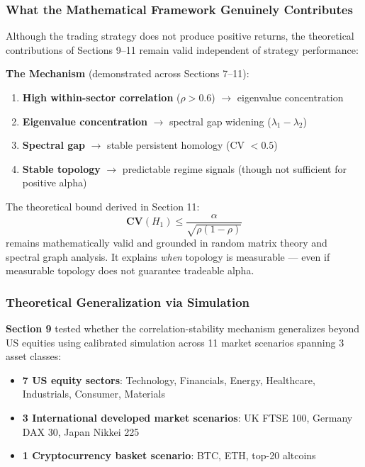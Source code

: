 \subsubsection{What the Mathematical Framework Genuinely Contributes}

Although the trading strategy does not produce positive returns, the theoretical contributions of Sections 9--11 remain valid independent of strategy performance:

\textbf{The Mechanism} (demonstrated across Sections 7--11):
\begin{enumerate}
\item \textbf{High within-sector correlation} ($\rho > 0.6$) $\rightarrow$ eigenvalue concentration
\item \textbf{Eigenvalue concentration} $\rightarrow$ spectral gap widening ($\lambda_1 - \lambda_2$)
\item \textbf{Spectral gap} $\rightarrow$ stable persistent homology (CV $< 0.5$)
\item \textbf{Stable topology} $\rightarrow$ predictable regime signals (though not sufficient for positive alpha)
\end{enumerate}

The theoretical bound derived in Section 11:
\begin{equation}
\textbf{CV}(H_1) \leq \frac{\alpha}{\sqrt{\rho(1-\rho)}}
\end{equation}
remains mathematically valid and grounded in random matrix theory and spectral graph analysis. It explains \textit{when} topology is measurable --- even if measurable topology does not guarantee tradeable alpha.

\subsubsection{Theoretical Generalization via Simulation}

\textbf{Section 9} tested whether the correlation-stability mechanism generalizes beyond US equities using calibrated simulation across 11 market scenarios spanning 3 asset classes:

\begin{itemize}
\item \textbf{7 US equity sectors}: Technology, Financials, Energy, Healthcare, Industrials, Consumer, Materials
\item \textbf{3 International developed market scenarios}: UK FTSE 100, Germany DAX 30, Japan Nikkei 225
\item \textbf{1 Cryptocurrency basket scenario}: BTC, ETH, top-20 altcoins
\end{itemize}


